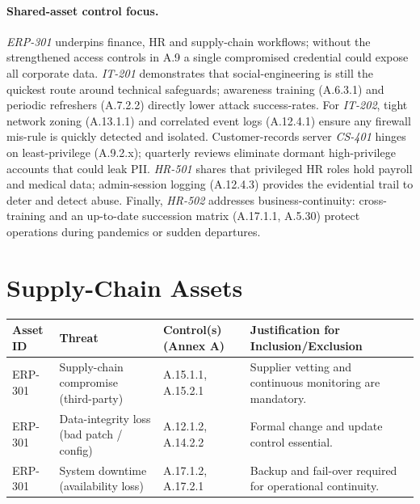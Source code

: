 \paragraph{Shared-asset control focus.}
\emph{ERP-301} underpins finance, HR and supply-chain workflows; without the strengthened access controls in A.9 a single compromised credential could expose all corporate data.  
\emph{IT-201} demonstrates that social-engineering is still the quickest route around technical safeguards; awareness training (A.6.3.1) and periodic refreshers (A.7.2.2) directly lower attack success-rates.  
For \emph{IT-202}, tight network zoning (A.13.1.1) and correlated event logs (A.12.4.1) ensure any firewall mis-rule is quickly detected and isolated.  
Customer-records server \emph{CS-401} hinges on least-privilege (A.9.2.x); quarterly reviews eliminate dormant high-privilege accounts that could leak PII.  
\emph{HR-501} shares that privileged HR roles hold payroll and medical data; admin-session logging (A.12.4.3) provides the evidential trail to deter and detect abuse.  
Finally, \emph{HR-502} addresses business-continuity: cross-training and an up-to-date succession matrix (A.17.1.1, A.5.30) protect operations during pandemics or sudden departures.

\section{Supply-Chain Assets}

\begin{longtable}{|p{2.2cm}|p{4.3cm}|p{4.7cm}|p{3.5cm}|}
\hline
\textbf{Asset ID} & \textbf{Threat} & \textbf{Control(s)\,(Annex A)} & \textbf{Justification for Inclusion/Exclusion} \\
\hline
\endhead
ERP-301 & Supply-chain compromise (third-party)   & A.15.1.1, A.15.2.1 & Supplier vetting and continuous monitoring are mandatory. \\
\hline
ERP-301 & Data-integrity loss (bad patch / config) & A.12.1.2, A.14.2.2 & Formal change and update control essential. \\
\hline
ERP-301 & System downtime (availability loss)      & A.17.1.2, A.17.2.1 & Backup and fail-over required for operational continuity. \\
\hline
\end{longtable}

